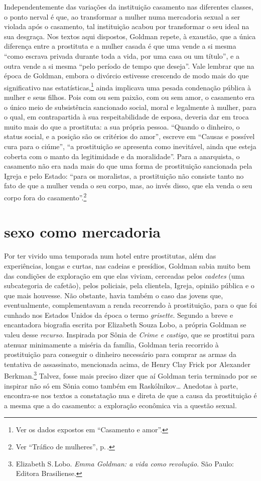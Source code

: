 Independentemente das variações da instituição casamento nas diferentes
classes, o ponto nerval é que, ao transformar a mulher
numa mercadoria sexual a ser violada
após o casamento, tal instituição acabou por transformar o seu ideal na sua desgraça.
Nos textos aqui dispostos, Goldman repete, à exaustão,
que a única diferença entre a prostituta e a mulher casada é que uma
vende a si mesma ``como escrava privada durante toda a vida, por uma
casa ou um título'', e a outra vende a si mesma ``pelo período de tempo
que deseja''. Vale lembrar que na época de Goldman, embora o divórcio
estivesse crescendo de modo mais do que significativo nas estatísticas,\footnote{Ver os dados expostos em ``Casamento e amor''.}
ainda implicava uma
pesada condenação pública à mulher e seus filhos. Pois com ou sem
paixão, com ou sem amor, o casamento era o único meio de subsistência
sancionado social, moral e legalmente à mulher, para o qual, em
contrapartida à sua respeitabilidade de esposa, deveria dar em troca
muito mais do que a prostituta: a sua própria pessoa. ``Quando o
dinheiro, o status social, e a posição são os critérios do amor'',
escreve em ``Causas e possível cura para o ciúme'', ``a prostituição se
apresenta como inevitável, ainda que esteja coberta com o manto da
legitimidade e da moralidade''. Para a anarquista, o casamento não era
nada mais do que uma forma de prostituição sancionada pela Igreja e pelo
Estado: ``para os moralistas, a prostituição não consiste tanto no fato de que a mulher
venda o seu corpo, mas, ao invés disso, que ela venda o seu corpo fora
do casamento''.\footnote{Ver ``Tráfico de mulheres'', p.\,\pageref{vender}.}

\section{sexo como mercadoria}

Por ter vivido uma temporada num hotel entre prostitutas, além das
experiências, longas e curtas, nas cadeias e presídios, Goldman sabia
muito bem das condições de exploração em que elas viviam, cerceadas
pelos \textit{cadetes} (uma subcategoria de cafetão), pelos policiais, pela
clientela, Igreja, opinião pública e o que mais houvesse. Não obstante,
havia também o caso das jovens que, eventualmente, complementavam a
renda recorrendo à prostituição, para o que foi cunhado nos Estados
Unidos da época o termo \textit{grisette}. Segundo a breve e encantadora
biografia escrita por Elizabeth Souza Lobo, a própria Goldman se valeu
desse \textit{recurso}. Inspirada por Sônia de \textit{Crime e castigo}, que se
prostitui para atenuar minimamente a miséria da família, Goldman
teria recorrido à prostituição para conseguir o
dinheiro necessário para comprar as armas da tentativa de assassinato,
mencionada acima, de Henry Clay Frick por Alexander Berkman.\footnote{Elizabeth S.\,Lobo. \textit{Emma Goldman: a vida como revolução}. São Paulo: Editora Brasiliense.}
Talvez, fosse mais preciso dizer que aí Goldman teria terminado por se
inspirar não só em Sônia como também em Raskólnikov\ldots{} Anedotas à parte,
encontra-se nos textos a constatação nua e
direta de que a causa da prostituição é a mesma que a do casamento: a
exploração econômica via a questão sexual.

